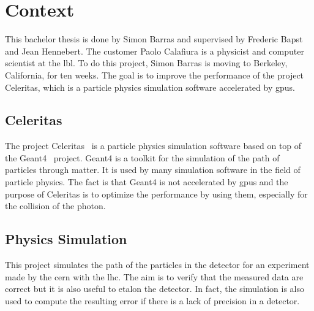 \chapter{Context}
\label{spec:ch:context}

This bachelor thesis is done by Simon Barras and supervised by Frederic Bapst and Jean Hennebert.
The customer Paolo Calafiura is a physicist and computer scientist at the \acrfull{lbl}.
To do this project, Simon Barras is moving to Berkeley, California, for ten weeks.
The goal is to improve the performance of the project Celeritas, which is a particle physics simulation software accelerated by \acrshort{gpu}s.




\section{Celeritas}
\label{spec:ch:context:celeritas}

The project Celeritas~\cite{Celeritas-Project} is a particle physics simulation software based on top of the Geant4~\cite{Geant4} project.
Geant4 is a toolkit for the simulation of the path of particles through matter.
It is used by many simulation software in the field of particle physics.
The fact is that Geant4 is not accelerated by \acrshort{gpu}s and the purpose of Celeritas is to optimize the performance by using them, especially for the collision of the photon.



\section{Physics Simulation}
\label{spec:ch:context:physics-simulation}

This project simulates the path of the particles in the detector for an experiment made by the \acrfull{cern} with the \acrfull{lhc}.
The aim is to verify that the measured data are correct but it is also useful to etalon the detector.
In fact, the simulation is also used to compute the resulting error if there is a lack of precision in a detector.

